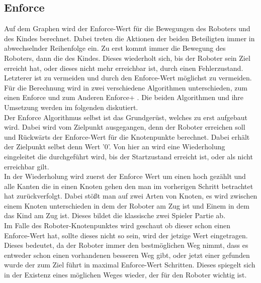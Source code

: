 \subsection{Enforce}
Auf dem Graphen wird der Enforce-Wert für die Bewegungen des Roboters und des Kindes berechnet. Dabei treten die Aktionen der beiden Beteiligten immer in abwechselnder Reihenfolge ein. Zu erst kommt immer die Bewegung des Roboters, dann die des Kindes. Dieses wiederholt sich, bis der Roboter sein Ziel erreicht hat, oder dieses nicht mehr erreichbar ist, durch einen Fehlerzustand. Letzterer ist zu vermeiden und durch den Enforce-Wert möglichst zu vermeiden. \\
Für die Berechnung wird in zwei verschiedene Algorithmen unterschieden, zum einen Enforce und zum Anderen Enforce+ . Die beiden Algorithmen und ihre Umsetzung werden im folgenden diskutiert. \\
Der Enforce Algorithmus selbst ist das Grundgerüst, welches zu erst aufgebaut wird. Dabei wird vom Zielpunkt ausgegangen, denn der Roboter erreichen soll und Rückwärts der Enforce-Wert für die Knotenpunkte berechnet. Dabei erhält der Zielpunkt selbst denn Wert '0'. Von hier an wird eine Wiederholung eingeleitet die durchgeführt wird, bis der Startzustand erreicht ist, oder als nicht erreichbar gilt. \\
In der Wiederholung wird zuerst der Enforce Wert um einen hoch gezählt und alle Kanten die in einen Knoten gehen den man im vorherigen Schritt betrachtet hat zurückverfolgt. Dabei stößt man auf zwei Arten von Knoten, es wird zwischen einem Knoten unterschieden in dem der Roboter am Zug ist und Einem in dem das Kind am Zug ist. Dieses bildet die klassische zwei Spieler Partie ab. \\
Im Falle des Roboter-Knotenpunktes wird geschaut ob dieser schon einen Enforce-Wert hat, sollte dieses nicht so sein, wird der jetzige Wert eingetragen. Dieses bedeutet, da der Roboter immer den bestmöglichen Weg nimmt, dass es entweder schon einen vorhandenen besseren Weg gibt, oder jetzt einer gefunden wurde der zum Ziel führt in maximal Enforce-Wert Schritten. Dieses spiegelt sich in der Existenz eines möglichen Weges wieder, der für den Roboter wichtig ist. \\
